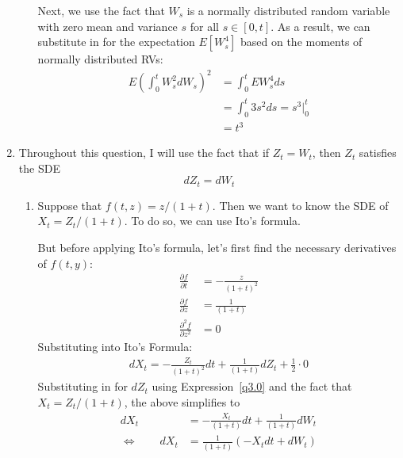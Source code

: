 \documentclass[12pt]{article}
\theoremstyle{plain}
\theoremstyle{definition}
\theoremstyle{remark}
\begin{document}
\begin{enumerate}
\begin{enumerate}
        Next, we use the fact that $W_s$ is a normally distributed
        random variable with zero mean and variance $s$ for all
        $s\in[0,t]$. As a result, we can substitute in for the
        expectation $E[W_s^4]$ based on the moments of normally
        distributed RVs:
        \begin{align*}
          E\left(\int^t_0 W_s^2 dW_s\right)^2
          &= \int^t_0 EW_s^4 ds\\
          &= \int^t_0 3s^2 ds = s^3|^t_0\\
          &= t^3
        \end{align*}

    \end{enumerate}

  \item %
    Throughout this question, I will use the fact that if $Z_t = W_t$,
    then $Z_t$ satisfies the SDE
    \begin{equation}
      dZ_t = dW_t
      \label{q3.0}
    \end{equation}
    \begin{enumerate}
      \item %
        Suppose that $f(t,z) = z/(1+t)$. Then we want to know the SDE of
        $X_t=Z_t/(1+t)$.  To do so, we can use Ito's formula.

        But before applying Ito's formula, let's first find the
        necessary derivatives of $f(t,y)$:
        \begin{align*}
          \frac{\partial f}{\partial t} &= -\frac{z}{(1+t)^2} \\
          \frac{\partial f}{\partial z} &= \frac{1}{(1+t)} \\
          \frac{\partial^2 f}{\partial z^2} &= 0
        \end{align*}
        Substituting into Ito's Formula:
        \begin{align*}
          dX_t = - \frac{Z_t}{(1+t)^2} dt
          + \frac{1}{(1+t)} dZ_t + \frac{1}{2}\cdot 0
        \end{align*}
        Substituting in for $dZ_t$ using Expression~\ref{q3.0} and the
        fact that $X_t = Z_t/(1+t)$, the above simplifies to
        \begin{align*}
          dX_t &= - \frac{X_t}{(1+t)} dt + \frac{1}{(1+t)} dW_t \\
          \Leftrightarrow \qquad
          dX_t&= \frac{1}{(1+t)} (-X_t dt + dW_t)
        \end{align*}


\end{enumerate}
\end{enumerate}
\end{document}
